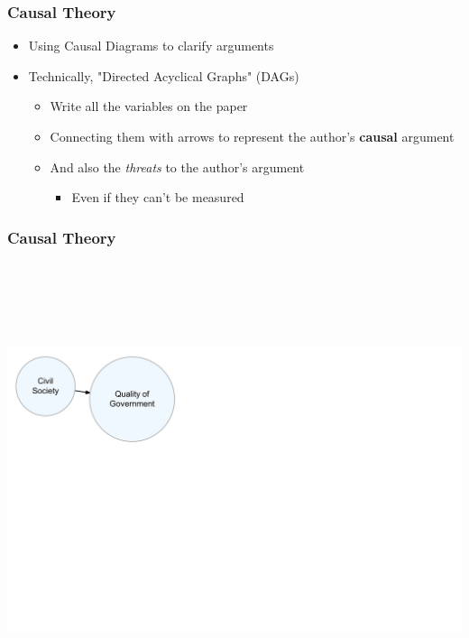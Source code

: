 \documentclass[xcolor=x11names,compress]{beamer}\usepackage[]{graphicx}\usepackage[]{color}
\newenvironment{knitrout}{}{} %
\renewcommand{\(}{\begin{columns}}
\renewcommand{\)}{\end{columns}}
\newcommand{\<}[1]{\begin{column}{#1}}
\renewcommand{\>}{\end{column}}
\begin{document}
\begin{frame}
\frametitle{Causal Theory}
\begin{itemize}
\item Using Causal Diagrams to clarify arguments
\pause
\item Technically, "Directed Acyclical Graphs" (DAGs)
\pause
\begin{itemize}
\item Write all the variables on the paper
\pause
\item Connecting them with arrows to represent the author's \textbf{causal} argument
\pause
\item And also the \textit{threats} to the author's argument
\begin{itemize}
\item Even if they can't be measured
\end{itemize}
\end{itemize}
\end{itemize}
\end{frame}



\begin{frame}
\frametitle{Causal Theory}
\begin{knitrout}
\color{fgcolor}

{\centering \includegraphics[width=800px,height=500]{figure/unnamed-chunk-2-1} 

}



\end{knitrout}
\end{frame}
\end{document}
